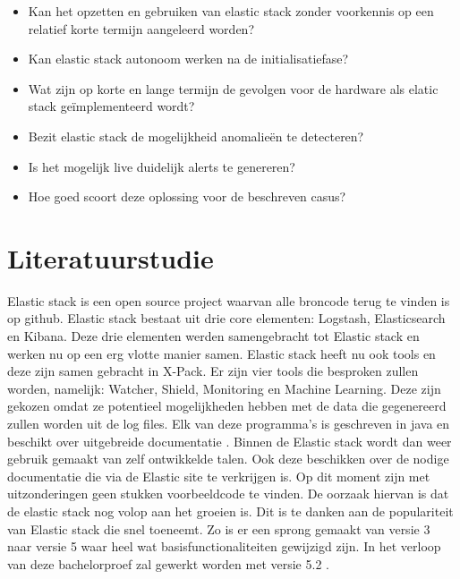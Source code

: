 \begin{itemize}
	\item Kan het opzetten en gebruiken van elastic stack zonder voorkennis op een relatief korte termijn aangeleerd worden?

	\item Kan elastic stack autonoom werken na de initialisatiefase?
    
    \item Wat zijn op korte en lange termijn de gevolgen voor de hardware als elatic stack geïmplementeerd wordt?

	\item Bezit elastic stack de mogelijkheid anomalieën te detecteren?
    
    \item Is het mogelijk live duidelijk alerts te genereren? 

	\item Hoe goed scoort deze oplossing voor de beschreven casus?
\end{itemize}


\section{Literatuurstudie}
\label{sec:literatuur-studie}

Elastic stack is een open source project waarvan alle broncode terug te vinden is op github. 
Elastic stack bestaat uit drie core elementen: Logstash, Elasticsearch en Kibana. Deze drie elementen werden samengebracht tot Elastic stack en werken nu op een erg vlotte manier samen. Elastic stack heeft nu ook tools en deze zijn samen gebracht in X-Pack. Er zijn vier tools die besproken zullen worden, namelijk: Watcher, Shield, Monitoring en Machine Learning. Deze zijn gekozen omdat ze potentieel mogelijkheden hebben met de data die gegenereerd zullen worden uit de log files.
Elk van deze programma's is geschreven in java en beschikt over uitgebreide documentatie \autocite{documentatiesite}. Binnen de Elastic stack wordt dan weer gebruik gemaakt van zelf ontwikkelde talen. Ook deze beschikken over de nodige documentatie die via de Elastic site te verkrijgen is. 
Op dit moment zijn met uitzonderingen geen stukken voorbeeldcode te vinden. De oorzaak hiervan is dat de elastic stack nog volop aan het groeien is. Dit is te danken aan de populariteit van Elastic stack die snel toeneemt. Zo is er een sprong gemaakt van versie 3 naar versie 5 waar heel wat basisfunctionaliteiten gewijzigd zijn. In het verloop van deze bachelorproef zal gewerkt worden met versie 5.2 .

